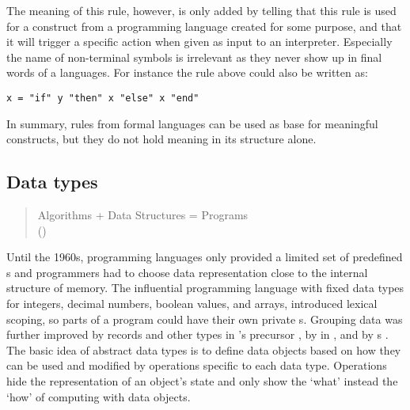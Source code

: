 \noindent
The meaning of this rule, however, is only added by telling that this rule
is used for a construct from a programming language created for some 
purpose, and that it will trigger a specific action when given as input
to an interpreter. Especially the name of non-terminal symbols is irrelevant
as they never show up in final words of a languages. For instance the rule above
could also be written as:

\begin{lstlisting}[language=BNF]
  x = "if" y "then" x "else" x "end"
\end{lstlisting}

\noindent
In summary, rules from formal languages can be used as base for meaningful
constructs, but they do not hold meaning in its structure alone.



\subsection{Data types}
\label{sec:datatypes}

\begin{quotation}%
Algorithms + Data Structures = Programs
\\ \quotationsource {} (\citeyear{Wirth1976})
\end{quotation}


\noindent Until the 1960s, programming languages only provided a limited set of
predefined s and programmers had to choose data representation
close to the internal structure of memory. The influential programming language
 \cite{Naur1963} with fixed data types for integers, decimal
numbers, boolean values, and arrays, introduced lexical scoping, so parts of a
program could have their own private s. Grouping data was
further improved by records and other types in 's precursor
 \cite{Wirth1966}, by  in 
\cite{Dahl1966}, and by s \cite{Liskov1974}. The basic
idea of abstract data types is to define data objects based on how they can be
used and modified by operations specific to each data type. Operations hide the
representation of an object's state and only show the `what' instead the `how'
of computing with data objects. 

